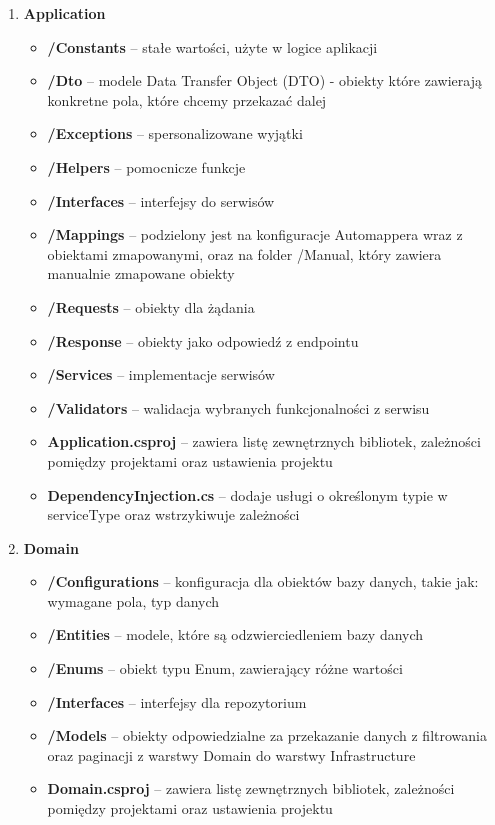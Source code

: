 \documentclass[a4paper,twoside,12pt]{book}
\begin{document}
\begin{enumerate}
    \item \textbf{Application} \begin{itemize}
        \item \textbf{/Constants} -- stałe wartości, użyte w logice aplikacji 
        \item \textbf{/Dto} -- modele Data Transfer Object (DTO) - obiekty które zawierają konkretne pola, które chcemy przekazać dalej 
        \item \textbf{/Exceptions} -- spersonalizowane wyjątki 
        \item \textbf{/Helpers} -- pomocnicze funkcje 
        \item \textbf{/Interfaces} -- interfejsy do serwisów 
        \item \textbf{/Mappings} -- podzielony jest na konfiguracje Automappera wraz z obiektami zmapowanymi, oraz na folder /Manual, który zawiera manualnie zmapowane obiekty 
        \item \textbf{/Requests} -- obiekty dla żądania 
        \item \textbf{/Response} -- obiekty jako odpowiedź z endpointu 
        \item \textbf{/Services} -- implementacje serwisów 
        \item \textbf{/Validators} -- walidacja wybranych funkcjonalności z serwisu 
        \item \textbf{Application.csproj} -- zawiera listę zewnętrznych bibliotek, zależności pomiędzy projektami oraz ustawienia projektu 
        \item \textbf{DependencyInjection.cs} -- dodaje usługi o określonym typie w serviceType oraz wstrzykiwuje zależności 
    \end{itemize}

    \item \textbf{Domain} \begin{itemize}
        \item \textbf{/Configurations } -- konfiguracja dla obiektów bazy danych, takie jak: wymagane pola, typ danych 
        \item \textbf{/Entities} -- modele, które są odzwierciedleniem bazy danych 
        \item \textbf{/Enums} -- obiekt typu Enum, zawierający różne wartości 
        \item \textbf{/Interfaces} -- interfejsy dla repozytorium 
        \item \textbf{/Models} -- obiekty odpowiedzialne za przekazanie danych z filtrowania oraz paginacji z warstwy Domain do warstwy Infrastructure 
        \item \textbf{Domain.csproj} -- zawiera listę zewnętrznych bibliotek, zależności pomiędzy projektami oraz ustawienia projektu 
    \end{itemize}


\end{enumerate}
\end{document}
